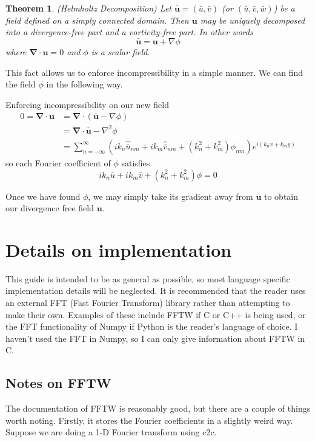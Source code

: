 \documentclass[a4paper,11pt]{article}
\theoremstyle{plain} %
\newtheorem{thm}{Theorem}[section]
\theoremstyle{remark}
\theoremstyle{definition} %
\renewcommand{\u}{\mathbf{u}}
\renewcommand{\div}{\mathbf{\nabla} \cdot}
\begin{document}
\begin{thm}(Helmholtz Decomposition)
Let $\bar{\u}=(\bar{u},\bar{v})$ (or $(\bar{u},\bar{v},\bar{w})$) be a field defined on a simply connected domain. Then $\u$ may be uniquely decomposed into a divergence-free part and a vorticity-free part. In other words
\[
\bar{\u}=\u + \nabla \phi
\]
where $\div \u=0$ and $\phi$ is a scalar field.
\end{thm}

This fact allows us to enforce incompressibility in a simple manner. We can find the field $\phi$ in the following way.

Enforcing incompressibility on our new field
\begin{align*}
0=\div \u &= \div(\bar{\u} - \nabla\phi)\\
          &= \div\bar{\u} - \nabla^2\phi\\
          &= \sum_{n=-\infty}^\infty \left(ik_n\widehat{\bar{u}}_{nm}+ik_m\widehat{\bar{v}}_{nm} + \left(k_n^2+k_m^2\right)\phi_{nm}\right)e^{i(k_nx+k_my)}
\end{align*}
so each Fourier coefficient of $\phi$ satisfies
\[
ik_n\bar{u}+ik_m\bar{v} + \left(k_n^2+k_m^2\right)\phi=0
\]

Once we have found $\phi$, we may simply take its gradient away from $\bar{\u}$ to obtain our divergence free field $\u$. 

\section{Details on implementation}
This guide is intended to be as general as possible, so most language specific implementation details will be neglected. It is recommended that the reader uses an external FFT (Fast Fourier Transform) library rather than attempting to make their own. Examples of these include FFTW if C or C++ is being used, or the FFT functionality of Numpy if Python is the reader's language of choice. I haven't used the FFT in Numpy, so I can only give information about FFTW in C.



\subsection{Notes on FFTW}
The documentation of FFTW is reasonably good, but there are a couple of things worth noting. Firstly, it stores the Fourier coefficients in a slightly weird way. Suppose we are doing a 1-D Fourier transform using c2c. 
\end{document}
